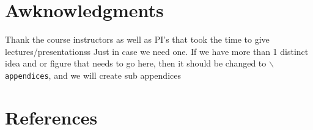 \documentclass[journal, final]{IEEEtran}
\begin{document}
    \section*{Awknowledgments}
        Thank the course instructors as well as PI's that took the time to give
        lectures/presentationss
    \appendix
        Just in case we need one. If we have more than 1 distinct idea
        and or figure that needs to go here, then it should be changed to
        $\backslash${\tt{appendices}}, and we will create sub appendices
        \section*{References}
\end{document}
